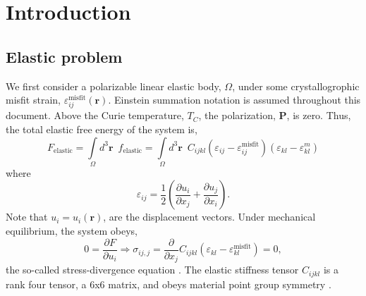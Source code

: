 \documentclass[16pt]{article} %
\begin{document}

\tableofcontents %

\newpage %


\section{Introduction}

\subsection{Elastic problem}

We first consider a polarizable linear elastic body, $\Omega$, under some crystallogrophic misfit strain, $\varepsilon_{ij}^\mathrm{misfit} (\textbf{r})$.
%
Einstein summation notation is assumed throughout this document.
%
Above the Curie temperature, $T_C$, the polarization, $\textbf{P}$, is zero. 
%
Thus, the total elastic free energy of the system is, 
%
\begin{equation}\tag{1}
F_\mathrm{elastic} = \int\limits_\Omega d^3 \textbf{r} \,\,\, f_\mathrm{elastic} = \int\limits_\Omega d^3 \textbf{r} \,\,\, C_{ijkl} \left(\varepsilon_{ij} - \varepsilon_{ij}^\mathrm{misfit} \right) \left(\varepsilon_{kl} - \varepsilon_{kl}^m \right) 
\end{equation}
%
where 
%
\begin{equation}\tag{2}
\varepsilon_{ij} = \frac{1}{2} \left(\frac{\partial u_i}{\partial x_j} + \frac{\partial u_j}{\partial x_i} \right).
\end{equation}
%
Note that $u_i =  u_i (\textbf{r})$, are the displacement vectors.
%
Under mechanical equilibrium, the system obeys,
%
\begin{equation}\tag{3}
0 = \frac{\partial F}{\partial u_i} \Rightarrow \sigma_{ij,j} = \frac{\partial}{\partial x_j} C_{ijkl} \left(\varepsilon_{kl} - \varepsilon_{kl}^\mathrm{misfit} \right) = 0,
\end{equation}
%
the so-called stress-divergence equation \cite{Morton1975, BowerBook}.
%
The elastic stiffness tensor $C_{ijkl}$ is a rank four tensor, a 6x6 matrix, and obeys material point group symmetry \cite{NyeBook}.
%
\end{document}
